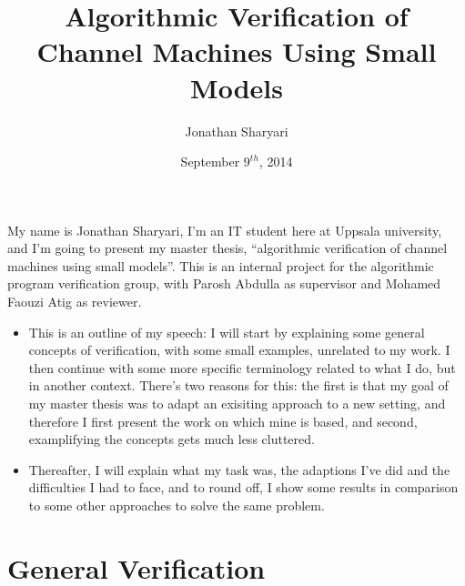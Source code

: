 \documentclass[handout]{beamer}
\title[] %
{Algorithmic Verification of Channel Machines Using Small Models}
\author[J, Sharyari | \emph{sharyari@gmail.com}] {Jonathan Sharyari}
\date[2014-09-09] %
{September $9^{th}$, 2014}
\institute[Dept.\ of Information Technology]
{Department of Information Technology\\
  Uppsala University \\ \vspace{10pt}
  Supervisor: Parosh Abdulla \\
  Reviewer: Mohamed Faouzi Atig}
\begin{document}
\begin{footnotesize}
\begin{frame}[plain]
My name is Jonathan Sharyari, I'm an IT student here at Uppsala university, and I'm going to present my master thesis, ``algorithmic verification of channel machines using small models''. This is an internal project for the algorithmic program verification group, with Parosh Abdulla as supervisor and Mohamed Faouzi Atig as reviewer.
\end{frame}

\begin{frame}
\begin{itemize}
\item
This is an outline of my speech: I will start by explaining some general concepts of verification, with some small examples, unrelated to my work. I then continue with some more specific terminology related to what I do, but in another context. There's two reasons for this: the first is that my goal of my master thesis was to adapt an exisiting approach to a new setting, and therefore I first present the work on which mine is based, and second, examplifying the concepts gets much less cluttered.
\item
Thereafter, I will explain what my task was, the adaptions I've did and the difficulties I had to face, and to round off, I show some results in comparison to some other approaches to solve the same problem.
\end{itemize}
\end{frame}


\section{General Verification}

\end{footnotesize}
\end{document}
